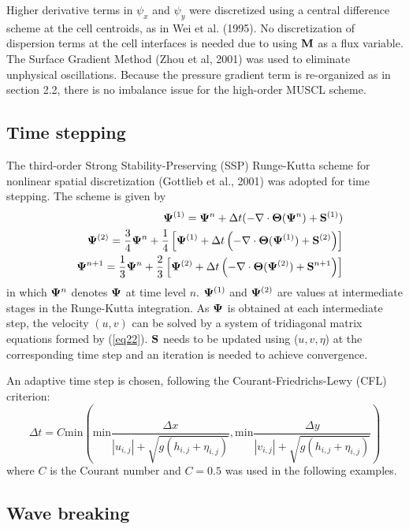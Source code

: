 \documentclass[11pt]{article}
\newcommand{\be}{\begin{equation}}
\newcommand{\ee}{\end{equation}}
\newcommand{\ba}{\begin{eqnarray}}
\newcommand{\ea}{\end{eqnarray}}
\begin{document}
Higher derivative terms in $\psi_x$ and $\psi_y$ were discretized using a central difference scheme at the cell centroids,  as in Wei et al. (1995). No discretization of dispersion terms at the cell interfaces is needed due to using ${\bf M}$ as a flux variable.   The Surface Gradient Method (Zhou et al, 2001) was used to eliminate unphysical oscillations. 
Because the pressure gradient term is re-organized as in section 2.2, there is no imbalance issue for the high-order MUSCL scheme. 


\subsection{Time stepping}

The third-order Strong Stability-Preserving (SSP) Runge-Kutta scheme for nonlinear spatial discretization (Gottlieb et al., 2001) was adopted for time stepping. The scheme is given by
\ba
\nonumber
&& {\bf \Psi}^{(1)} = {\bf \Psi}^{n}  + \Delta t (- \nabla \cdot {\bf \Theta} ({\bf \Psi}^n) + {\bf S}^{(1)} ) \\
&&  {\bf \Psi}^{(2)} = \frac{3}{4}{\bf \Psi}^{n}  + \frac{1}{4} \left[   {\bf \Psi}^{(1)} +  \Delta t \left (- \nabla \cdot {\bf \Theta} ({\bf \Psi}^{(1)} ) + {\bf S}^{(2)} \right) \right] \\
\nonumber
&&  {\bf \Psi}^{n+1} = \frac{1}{3}{\bf \Psi}^{n}  + \frac{2}{3} \left[   {\bf \Psi}^{(2)} +  \Delta t \left (- \nabla \cdot {\bf \Theta} ({\bf \Psi}^{(2)} ) + {\bf S}^{n+1} \right) \right]
\label{runge}
\ea
in which ${\bf \Psi}^{n}$ denotes ${\bf \Psi}$  at time level $n$.  ${\bf \Psi}^{(1)}$ and ${\bf \Psi}^{(2)}$ are values at intermediate stages in the Runge-Kutta integration. As ${\bf \Psi}$ is obtained at each intermediate step,  the velocity $(u, v)$ can be solved by a system of tridiagonal matrix equations formed by (\ref{eq22}).    ${\bf S}$  needs to be updated using ($u,v,\eta$) at the corresponding time step and an iteration is needed to achieve convergence.  %

An  adaptive time step is chosen, following the Courant-Friedrichs-Lewy (CFL) criterion:
\be
\Delta t = C  \mbox{min} \left ( \mbox{min} \frac{\Delta x}{|u_{i,j}| + \sqrt{g (h_{i,j} +\eta_{i,j})}},  \mbox{min} \frac{\Delta y}{|v_{i,j}| + \sqrt{g (h_{i,j} +\eta_{i,j})}} \right )
\label{cfl}
\ee
where $C$ is the Courant number and $C=0.5$ was used in the following examples.  

\subsection{Wave breaking}  
\end{document}

